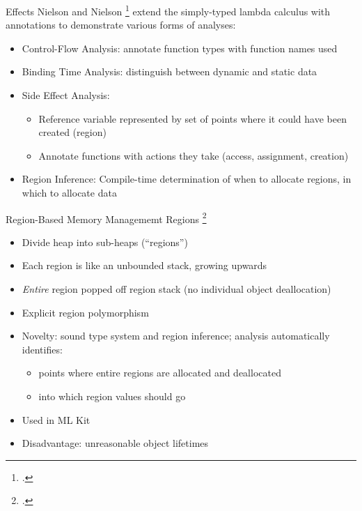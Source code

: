 \documentclass[aspectratio=169]{beamer}
\begin{document}

\begin{frame}{Effects}
    Nielson and Nielson \footcite{nielson_type_1999} extend the simply-typed lambda calculus with annotations to demonstrate various forms of analyses:
    \begin{itemize}
        \item Control-Flow Analysis: annotate function types with function names used
        \item Binding Time Analysis: distinguish between dynamic and static data
        \item Side Effect Analysis:
            \begin{itemize}
                \item Reference variable represented by set of points where it could have been created (\alert{region})
                \item Annotate functions with actions they take (access, assignment, creation)
            \end{itemize}
        \item \alert{Region} Inference: Compile-time determination of when to allocate regions, in which to allocate data
    \end{itemize}
\end{frame}


\begin{frame}{Region-Based Memory Managememt}
    Regions \footcite{tofte_region-based_1997}
    \begin{itemize}
        \item Divide heap into sub-heaps (``regions'')
        \item Each region is like an unbounded stack, growing upwards
        \item \emph{Entire} region popped off region stack (no individual object deallocation)
        \item Explicit region polymorphism %
        \item Novelty: sound type system and region inference; analysis automatically identifies:
            \vspace{-0.1in}
            \begin{itemize}
                \item points where entire regions are allocated and deallocated
                \item into which region values should go
            \end{itemize}
        \item Used in ML Kit
        \item Disadvantage: unreasonable object lifetimes %
    \end{itemize}
\end{frame}
\end{document}
